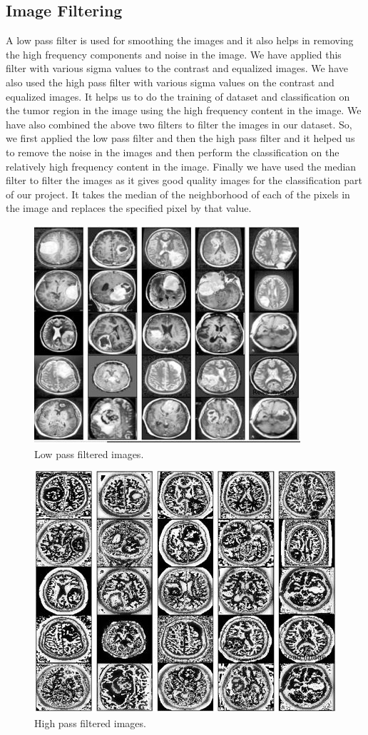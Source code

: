\documentclass[conference]{IEEEtran}
\begin{document}
\subsection{Image Filtering}
A low pass filter is used for smoothing the images and it also helps in removing the high frequency components and noise in the image. We have applied this filter with various sigma values to the contrast and equalized images.
We have also used the high pass filter with various sigma values on the contrast and equalized images. It helps us to do the training of dataset and classification on the tumor region in the image using the high frequency content in the image.
We have also combined the above two filters to filter the images in our dataset. So, we first applied the low pass filter and then the high pass filter and it helped us to remove the noise in the images and then perform the classification on the relatively high frequency content in the image.
Finally we have used the median filter to filter the images as it gives good quality images for the classification part of our project. It takes the median of the neighborhood of each of the pixels in the image and replaces the specified pixel by that value. 
\begin{figure}[h]
\centering
\includegraphics[scale=0.43]{figures/lpf.JPG}
\caption{Low pass filtered images.}
\end{figure}
\begin{figure}[h]
\centering
\includegraphics[scale=0.40]{figures/hpf.JPG}
\caption{High pass filtered images.}
\end{figure}
\end{document}
